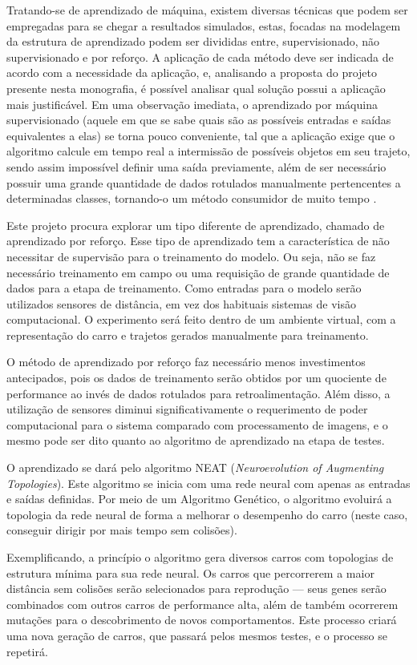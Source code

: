 Tratando-se de aprendizado de máquina, existem diversas técnicas que
podem ser empregadas para se chegar a resultados simulados, estas, focadas
na modelagem da estrutura de aprendizado podem ser divididas entre,
supervisionado, não supervisionado e por reforço. A aplicação de cada método
deve ser indicada de acordo com a necessidade da aplicação, e, analisando a
proposta do projeto presente nesta monografia, é possível analisar qual solução
possui a aplicação mais justificável. Em uma observação imediata, o
aprendizado por máquina supervisionado (aquele em que se sabe quais são as
possíveis entradas e saídas equivalentes a elas) se torna pouco conveniente, tal que a
aplicação exige que o algoritmo calcule em tempo real a intermissão de possíveis
objetos em seu trajeto, sendo assim impossível definir uma saída previamente, 
além de ser necessário possuir uma grande quantidade de dados rotulados manualmente
pertencentes a determinadas classes, tornando-o um método consumidor de muito tempo \cite{guney2017}.

Este projeto procura explorar um tipo diferente de aprendizado, chamado
de aprendizado por reforço. Esse tipo de aprendizado tem a característica de
não necessitar de supervisão para o treinamento do modelo. Ou seja, não se faz
necessário treinamento em campo ou uma requisição de grande quantidade de
dados para a etapa de treinamento. Como entradas para o modelo serão
utilizados sensores de distância, em vez dos habituais sistemas de visão
computacional. O experimento será feito dentro de um ambiente virtual, com a
representação do carro e trajetos gerados manualmente para treinamento.

O método de aprendizado por reforço faz necessário menos investimentos
antecipados, pois os dados de treinamento serão obtidos por um quociente de
performance ao invés de dados rotulados para retroalimentação. Além disso, a
utilização de sensores diminui significativamente o requerimento de poder
computacional para o sistema comparado com processamento de imagens, e o
mesmo pode ser dito quanto ao algoritmo de aprendizado na etapa de testes.

O aprendizado se dará pelo algoritmo NEAT (\textit{Neuroevolution of
Augmenting Topologies}). Este algoritmo se inicia com uma rede neural com
apenas as entradas e saídas definidas. Por meio de um Algoritmo Genético, o
algoritmo evoluirá a topologia da rede neural de forma a melhorar o desempenho
do carro (neste caso, conseguir dirigir por mais tempo sem colisões).

Exemplificando, a princípio o algoritmo gera diversos carros com topologias
de estrutura mínima para sua rede neural. Os carros que percorrerem a maior 
distância sem colisões serão selecionados para reprodução — seus genes serão 
combinados com outros carros de performance alta, além de também ocorrerem mutações
para o descobrimento de novos comportamentos. Este processo criará uma nova
geração de carros, que passará pelos mesmos testes, e o processo se repetirá.

